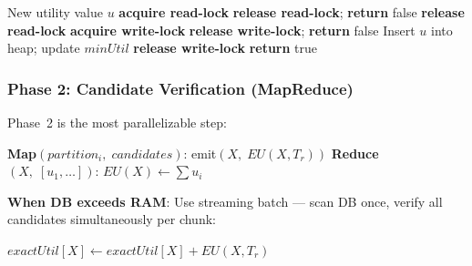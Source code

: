 \begin{algorithm}[H]
\caption{Thread-Safe Top-$k$ Threshold Update (Double-Check Lock)}
\begin{algorithmic}[1]
\Require New utility value $u$
\State \textbf{acquire read-lock}
    \State \textbf{release read-lock}; \textbf{return} false 
\EndIf
\State \textbf{release read-lock}
\State \textbf{acquire write-lock}
    \State \textbf{release write-lock}; \textbf{return} false 
\EndIf
\State Insert $u$ into heap; update $minUtil$
\State \textbf{release write-lock}
\State \textbf{return} true
\end{algorithmic}
\end{algorithm}

\subsubsection{Phase 2: Candidate Verification (MapReduce)}

Phase~2 is the most parallelizable step:

\begin{algorithm}[H]
\caption{MapReduce for Phase 2 Verification}
\begin{algorithmic}[1]
\State \textbf{Map}$(partition_i,\; candidates)$:
     \State emit$(X,\; EU(X, T_r))$ \EndIf
\EndFor
\State \textbf{Reduce}$(X,\; [u_1, \ldots])$: $EU(X) \leftarrow \sum u_i$
\end{algorithmic}
\end{algorithm}

\textbf{When DB exceeds RAM}: Use streaming batch --- scan DB once, verify all candidates simultaneously per chunk:

\begin{algorithm}[H]
\caption{Streaming Batch Verification (Out-of-Core)}
\begin{algorithmic}[1]
     
            \State $exactUtil[X] \leftarrow exactUtil[X] + EU(X, T_r)$
        \EndIf
    \EndFor
\EndFor
\end{algorithmic}
\end{algorithm}